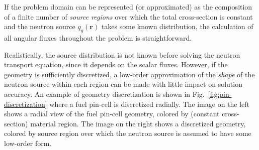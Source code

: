 
If the problem domain can be represented (or approximated) as the composition of a finite number of \textit{source regions} over which the total cross-section is constant and the neutron source $q_g(\mathbf{r})$ takes some known distribution, the calculation of all angular fluxes throughout the problem is straightforward.

Realistically, the source distribution is not known before solving the neutron transport equation, since it depends on the scalar fluxes. However, if the geometry is sufficiently discretized, a low-order approximation of the \textit{shape} of the neutron source within each region can be made with little impact on solution accuracy. An example of geometry discretization is shown in Fig.~\ref{fig:pin-discretization} where a fuel pin-cell is discretized radially. The image on the left shows a radial view of the fuel pin-cell geometry, colored by (constant cross-section) material region. The image on the right shows a discretized geometry, colored by source region over which the neutron source is assumed to have some low-order form.

